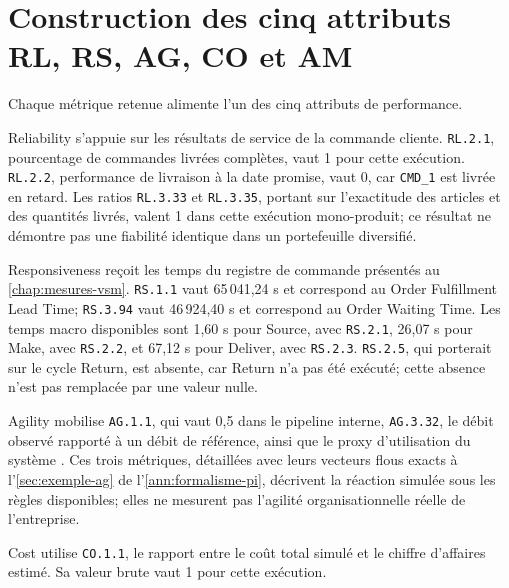 \section{Construction des cinq attributs RL, RS, AG, CO et AM}

Chaque métrique retenue alimente l'un des cinq attributs de performance.

Reliability s'appuie sur les résultats de service de la commande cliente. \texttt{RL.2.1}, pourcentage de commandes livrées complètes, vaut 1 pour cette exécution. \texttt{RL.2.2}, performance de livraison à la date promise, vaut 0, car \texttt{CMD\_1} est livrée en retard. Les ratios \texttt{RL.3.33} et \texttt{RL.3.35}, portant sur l'exactitude des articles et des quantités livrés, valent 1 dans cette exécution mono-produit; ce résultat ne démontre pas une fiabilité identique dans un portefeuille diversifié.

\begin{sloppypar}
Responsiveness reçoit les temps du registre de commande présentés au \cref{chap:mesures-vsm}. \texttt{RS.1.1} vaut 65\,041,24 s et correspond au Order Fulfillment Lead Time; \texttt{RS.3.94} vaut 46\,924,40 s et correspond au Order Waiting Time. Les temps macro disponibles sont 1,60 s pour Source, avec \texttt{RS.2.1}, 26,07 s pour Make, avec \texttt{RS.2.2}, et 67,12 s pour Deliver, avec \texttt{RS.2.3}. \texttt{RS.2.5}, qui porterait sur le cycle Return, est absente, car Return n'a pas été exécuté; cette absence n'est pas remplacée par une valeur nulle.
\end{sloppypar}

Agility mobilise \texttt{AG.1.1}, qui vaut 0,5 dans le pipeline interne, \texttt{AG.3.32}, le débit observé rapporté à un débit de référence, ainsi que le proxy d'utilisation du système . Ces trois métriques, détaillées avec leurs vecteurs flous exacts à l'\cref{sec:exemple-ag} de l'\cref{ann:formalisme-pi}, décrivent la réaction simulée sous les règles disponibles; elles ne mesurent pas l'agilité organisationnelle réelle de l'entreprise.

Cost utilise \texttt{CO.1.1}, le rapport entre le coût total simulé et le chiffre d'affaires estimé. Sa valeur brute vaut 1 pour cette exécution.


